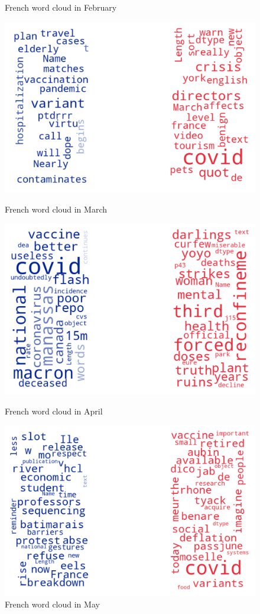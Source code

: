 \begin{landscape}
\begin{figure}[!htb]
  \caption{French word cloud in February}\label{fig:februaryfr}
\endminipage
\end{figure}
\begin{figure}[!htb]
  \includegraphics[width=\linewidth]{March fr word cloud.png}
  \caption{French word cloud in March}\label{fig:marchfr}
\endminipage\hfill
{}
  \includegraphics[width=\linewidth]{April fr word cloud.png}
  \caption{French word cloud in April}\label{fig:aprilfr}
\endminipage\hfill
{}
  \includegraphics[width=\linewidth]{May fr word cloud.png}
  \caption{French word cloud in May}\label{fig:mayfr}
\endminipage
\end{figure}



\end{landscape}
